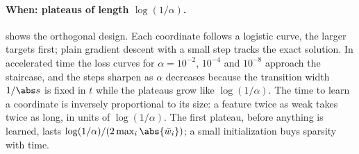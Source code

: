 \begin{refsection}
\paragraph{When: plateaus of length $\log(1/\alpha)$.}  shows the orthogonal design. Each coordinate follows a logistic curve, the larger targets first; plain gradient descent with a small step tracks the exact solution. In accelerated time the loss curves for $\alpha=10^{-2}$, $10^{-4}$ and $10^{-8}$ approach the staircase, and the steps sharpen as $\alpha$ decreases because the transition width $1/\abs s$ is fixed in $t$ while the plateaus grow like $\log(1/\alpha)$. The time to learn a coordinate is inversely proportional to its size: a feature twice as weak takes twice as long, in units of $\log(1/\alpha)$. The first plateau, before anything is learned, lasts $\log(1/\alpha)/(2\max_i\abs{\diagbar_i})$; a small initialization buys sparsity with time.


\end{refsection}
